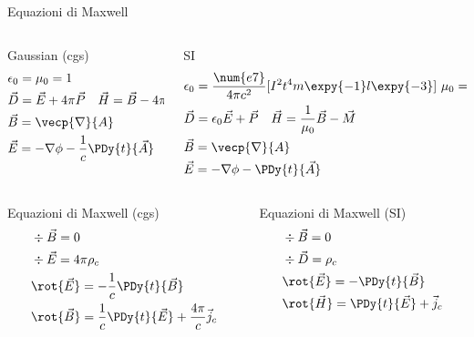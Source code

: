 \begin{frame}{Equazioni di Maxwell}

\begin{columns}
\begin{column}{0.5\textwidth}
    \begin{block}{Gaussian (cgs)}
\begin{align*}
&\epsilon_0=\mu_0=1\\
&\vec{D}=\vec{E}+4\pi\vec{P}\quad\vec{H}=\vec{B}-4\pi\vec{M}\\
&\vec{B}=\vecp{\nabla}{A}\\
&\vec{E}=-\nabla\phi-\frac{1}{c}\PDy{t}{\vec{A}}
\end{align*}    
    \end{block}
\end{column}
\begin{column}{0.5\textwidth}
        \begin{block}{SI}
\begin{align*}
&\epsilon_0=\frac{\num{e7}}{4\pi c^2}[I^2t^4m\expy{-1}l\expy{-3}]\ \mu_0=\frac{1}{\epsilon_0c^2}\\
&\vec{D}=\epsilon_0\vec{E}+\vec{P}\quad\vec{H}=\frac{1}{\mu_0}\vec{B}-\vec{M}\\
&\vec{B}=\vecp{\nabla}{A}\\
&\vec{E}=-\nabla\phi-\PDy{t}{\vec{A}}
\end{align*}    
    \end{block}
\end{column}
\end{columns}
\begin{columns}
\begin{column}{0.5\textwidth}
    \begin{block}{Equazioni di Maxwell (cgs)}
\begin{align*}
    &\div{\vec{B}}=0\\
    &\div{\vec{E}}=4\pi\rho_c\\
    &\rot{\vec{E}}=-\frac{1}{c}\PDy{t}{\vec{B}}\\
    &\rot{\vec{B}}=\frac{1}{c}\PDy{t}{\vec{E}}+\frac{4\pi}{c}\vec{j}_c
\end{align*}    
    \end{block}
\end{column}
\begin{column}{0.5\textwidth}
        \begin{block}{Equazioni di Maxwell (SI)}
\begin{align*}
    &\div{\vec{B}}=0\\
    &\div{\vec{D}}=\rho_c\\
    &\rot{\vec{E}}=-\PDy{t}{\vec{B}}\\
    &\rot{\vec{H}}=\PDy{t}{\vec{E}}+\vec{j}_c
\end{align*}    
    \end{block}
\end{column}
\end{columns}

\end{frame}

